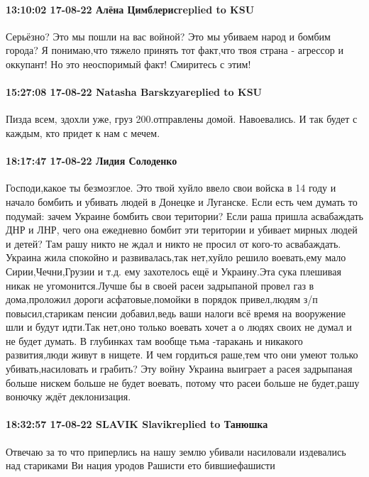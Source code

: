  
 
 
 
 

\paragraph{13:10:02 17-08-22 Алёна Цимблерисreplied to KSU}

Серьёзно? Это мы пошли на вас войной? Это мы убиваем народ и бомбим города? Я
понимаю,что тяжело принять тот факт,что твоя страна - агрессор и оккупант! Но
это неоспоримый факт! Смиритесь с этим!

\paragraph{15:27:08 17-08-22 Natasha Barskzyareplied to KSU}

Пизда всем, здохли уже, груз 200.отправлены домой. Навоевались. И так будет с
каждым, кто придет к нам с мечем.

\paragraph{18:17:47 17-08-22 Лидия Солоденко}

\obeycr
Господи,какое ты безмозглое.
Это твой хуйло ввело свои войска в 14 году и начало бомбить и убивать людей в Донецке и Луганске.
Если есть чем думать то подумай: зачем Украине бомбить свои територии?
Если раша пришла асвабаждать ДНР и ЛНР, чего она ежедневно бомбит эти територии и убивает мирных людей и детей? Там рашу никто не ждал и никто не просил от кого-то асвабаждать.
Украина жила спокойно и развивалась,так нет,хуйло решило воевать,ему мало Сирии,Чечни,Грузии и т.д. ему захотелось ещё и Украину.Эта сука плешивая никак не угомонится.Лучше бы в своей расеи задрыпаной провел газ в дома,проложил дороги асфатовые,помойки в порядок привел,людям з/п повысил,старикам пенсии добавил,ведь ваши налоги всё время на вооружение шли и будут идти.Так нет,оно только воевать хочет а о людях своих не думал и не будет думать.
В глубинках там вообще тьма -таракань и никакого развития,люди живут в нищете. И чем гордиться раше,тем что они умеют только убивать,насиловать и грабить?
Эту войну Украина выиграет а расея задрыпаная больше нискем больше не будет воевать, потому что расеи больше не будет,рашу вонючку ждёт деклонизация.
\restorecr

\paragraph{18:32:57 17-08-22 SLAVIK Slavikreplied to Танюшка}

Отвечаю за то что приперлись на нашу землю убивали насиловали издевались над
стариками Ви нация уродов Рашисти ето бившиефашисти
